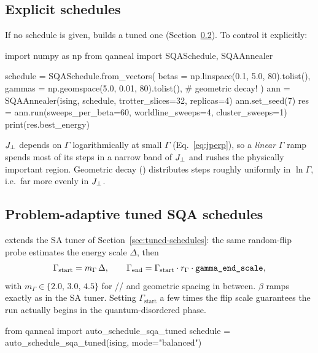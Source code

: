 \subsection{Explicit schedules}

If no schedule is given,  builds a tuned one
(Section~\ref{sec:sqa-tuned}). To control it explicitly:

\begin{pycode}
import numpy as np
from qanneal import SQASchedule, SQAAnnealer

schedule = SQASchedule.from_vectors(
    betas  = np.linspace(0.1, 5.0, 80).tolist(),
    gammas = np.geomspace(5.0, 0.01, 80).tolist(),   # geometric decay!
)
ann = SQAAnnealer(ising, schedule, trotter_slices=32, replicas=4)
ann.set_seed(7)
res = ann.run(sweeps_per_beta=60, worldline_sweeps=4, cluster_sweeps=1)
print(res.best_energy)
\end{pycode}

\begin{warnbox}
$J_{\perp}$ depends on $\Gamma$ logarithmically at small $\Gamma$
(Eq.~\eqref{eq:jperp}), so a \emph{linear} $\Gamma$ ramp spends most of its
steps in a narrow band of $J_{\perp}$ and rushes the physically important region.
Geometric decay () distributes steps roughly uniformly in
$\ln\Gamma$, i.e.\ far more evenly in $J_{\perp}$.
\end{warnbox}

\subsection{Problem-adaptive tuned SQA schedules}
\label{sec:sqa-tuned}

 extends the SA tuner of
Section~\ref{sec:tuned-schedules}: the same random-flip probe estimates the
energy scale $\Delta$, then
\begin{equation}
\Gamma_{\text{start}}=m_\Gamma\,\Delta,\qquad
\Gamma_{\text{end}}=\Gamma_{\text{start}}\cdot r_\Gamma\cdot
\code{gamma\_end\_scale},
\end{equation}
with $m_\Gamma\in\{2.0,\,3.0,\,4.5\}$ for
// and geometric spacing in between.
$\beta$ ramps exactly as in the SA tuner. Setting
$\Gamma_{\text{start}}$ a few times the flip scale guarantees the run
actually begins in the quantum-disordered phase.

\begin{pycode}
from qanneal import auto_schedule_sqa_tuned
schedule = auto_schedule_sqa_tuned(ising, mode="balanced")
\end{pycode}

